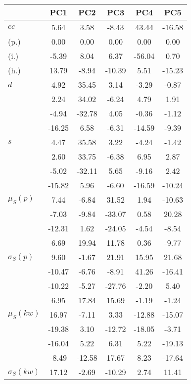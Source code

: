\begin{table}[h!]
\begin{center}
\begin{tabular}{| l | c | c | c | c | c |}\hline
 & PC1 & PC2 & PC3 & PC4 & PC5 \\\hline
$cc$ & 5.64  & 3.58  & -8.43  & 43.44  & -16.58 \\\hline
(p.) & 0.00  & 0.00  & 0.00  & 0.00  & 0.00 \\\hline
(i.) & -5.39  & 8.04  & 6.37  & -56.04  & 0.70 \\\hline
(h.) & 13.79  & -8.94  & -10.39  & 5.51  & -15.23 \\\hline
$d$ & 4.92  & 35.45  & 3.14  & -3.29  & -0.87 \\\hline
 & 2.24  & 34.02  & -6.24  & 4.79  & 1.91 \\\hline
 & -4.94  & -32.78  & 4.05  & -0.36  & -1.12 \\\hline
 & -16.25  & 6.58  & -6.31  & -14.59  & -9.39 \\\hline
$s$ & 4.47  & 35.58  & 3.22  & -4.24  & -1.42 \\\hline
 & 2.60  & 33.75  & -6.38  & 6.95  & 2.87 \\\hline
 & -5.02  & -32.11  & 5.65  & -9.16  & 2.42 \\\hline
 & -15.82  & 5.96  & -6.60  & -16.59  & -10.24 \\\hline
$\mu_S(p)$ & 7.44  & -6.84  & 31.52  & 1.94  & -10.63 \\\hline
 & -7.03  & -9.84  & -33.07  & 0.58  & 20.28 \\\hline
 & -12.31  & 1.62  & -24.05  & -4.54  & -8.54 \\\hline
 & 6.69  & 19.94  & 11.78  & 0.36  & -9.77 \\\hline
$\sigma_S(p)$ & 9.60  & -1.67  & 21.91  & 15.95  & 21.68 \\\hline
 & -10.47  & -6.76  & -8.91  & 41.26  & -16.41 \\\hline
 & -10.22  & -5.27  & -27.76  & -2.20  & 5.40 \\\hline
 & 6.95  & 17.84  & 15.69  & -1.19  & -1.24 \\\hline
$\mu_S(kw)$ & 16.97  & -7.11  & 3.33  & -12.88  & -15.07 \\\hline
 & -19.38  & 3.10  & -12.72  & -18.05  & -3.71 \\\hline
 & -16.04  & 5.22  & 6.31  & 5.22  & -19.13 \\\hline
 & -8.49  & -12.58  & 17.67  & 8.23  & -17.64 \\\hline
$\sigma_S(kw)$ & 17.12  & -2.69  & -10.29  & 2.74  & 11.41 \\\hline

\end{tabular}
\end{center}
\end{table}
